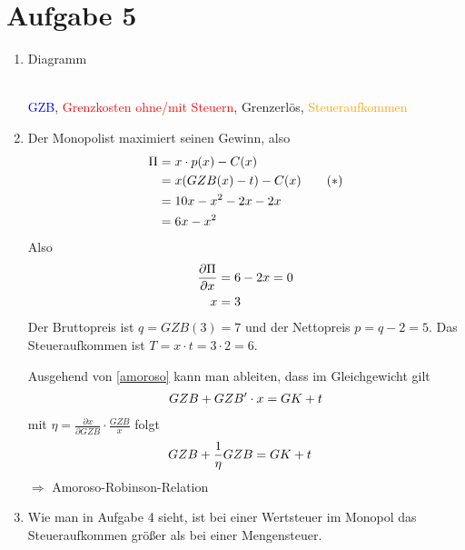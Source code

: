 \documentclass{article}
\begin{document}
	\section*{Aufgabe 5}
	\begin{enumerate}[label=(\alph*)]
		\item Diagramm
		\begin{center}
			 \\
			\textcolor{blue}{GZB}, \textcolor{red}{Grenzkosten ohne/mit Steuern}, \textcolor{green!80!black}{Grenzerlös}, \textcolor{orange}{Steueraufkommen}
		\end{center}
		\item Der Monopolist maximiert seinen Gewinn, also
		\begin{align}
			\Pi &= x\cdot p(x) - C(x) \notag \\
			\label{amoroso}
			&= x(GZB(x) - t) - C(x) \tag{\textasteriskcentered} \\
			&= 10x-x^2-2x-2x \notag \\
			&= 6x-x^2 \notag
		\end{align}
		Also
		\begin{align}
			\frac{\partial\Pi}{\partial x} &= 6-2x = 0 \notag \\
			x &= 3 \notag
		\end{align}
		Der Bruttopreis ist $q=GZB(3)=7$ und der Nettopreis $p=q-2=5$. Das Steueraufkommen ist $T=x\cdot t=3\cdot 2=6$.
		
		Ausgehend von \eqref{amoroso} kann man ableiten, dass im Gleichgewicht gilt
		\begin{align}
			GZB + GZB'\cdot x = GK + t \notag
		\end{align}
		mit $\eta=\frac{\partial x}{\partial GZB}\cdot\frac{GZB}{x}$ folgt
		\begin{align}
			GZB + \frac{1}{\eta}GZB &= GK + t \notag
		\end{align}
		$\Rightarrow$ Amoroso-Robinson-Relation
		\item Wie man in Aufgabe 4 sieht, ist bei einer Wertsteuer im Monopol das Steueraufkommen größer als bei einer Mengensteuer.
	\end{enumerate}
\end{document}
